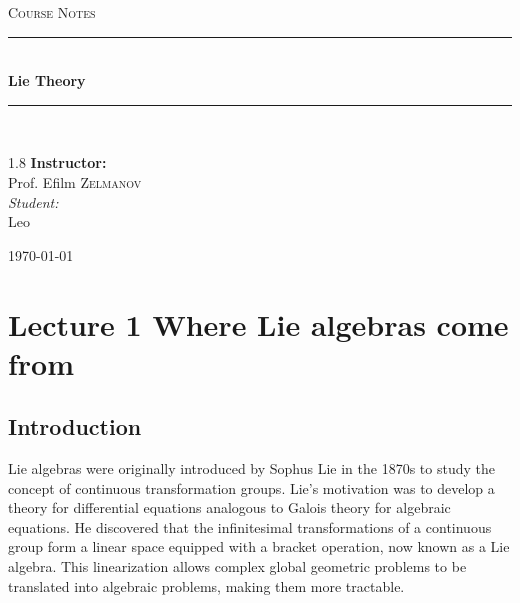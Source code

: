 \documentclass[11pt, a4paper]{report}
\newcommand{\HRule}[1]{\rule{\linewidth}{#1}}
\begin{document}
\begin{titlepage}
    \centering
    \vspace*{2cm}
    
    \textsc{\Large Course Notes}\\[0.5cm]

    \HRule{1.5pt} \\[0.5cm]
    { \huge \bfseries Lie Theory }\\[0.4cm] 
    \HRule{1.5pt} \\[1.5cm]
    
    \vspace{3cm}

    \begin{spacing}{1.8}
        {\Large \textbf{Instructor:}} \\
        {\Large Prof. Efilm \textsc{Zelmanov}} \\[0.8cm]
        
        {\normalsize \textit{Student:}} \\
        {\normalsize Leo}
    \end{spacing}

    \vfill
    {\large \today}
\end{titlepage}
\newpage
\tableofcontents
\newpage


\chapter{Lecture 1 Where Lie algebras come from}

\section{Introduction}

Lie algebras were originally introduced by Sophus Lie in the 1870s to study the concept of continuous transformation groups. Lie's motivation was to develop a theory for differential equations analogous to Galois theory for algebraic equations. He discovered that the infinitesimal transformations of a continuous group form a linear space equipped with a bracket operation, now known as a Lie algebra. This linearization allows complex global geometric problems to be translated into algebraic problems, making them more tractable.
\end{document}
